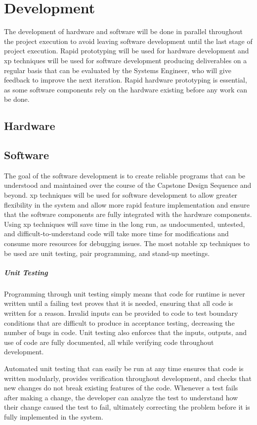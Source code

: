 \chapter{Development}
The development of hardware and software will be done in parallel throughout the project execution to avoid leaving software development until the last stage of project execution. 
Rapid prototyping will be used for hardware development and \gls{xp} techniques will be used for software development producing deliverables on a regular basis that can be evaluated by the Systems Engineer, who will give feedback to improve the next iteration. 
Rapid hardware prototyping is essential, as some software components rely on the hardware existing before any work can be done.
\section{Hardware}
\section{Software}
The goal of the software development is to create reliable programs that can be understood and maintained over the course of the Capstone Design Sequence and beyond.
\gls{xp} techniques will be used for software development to allow greater flexibility in the system and allow more rapid feature implementation and ensure that the software components are fully integrated with the hardware components. 
Using \gls{xp} techniques will save time in the long run, as undocumented, untested, and difficult-to-understand code will take more time for modifications and consume more resources for debugging issues.
The most notable \gls{xp} techniques to be used are unit testing, pair programming, and stand-up meetings.

\paragraph{Unit Testing}
Programming through unit testing simply means that code for runtime is never written until a failing test proves that it is needed, ensuring that all code is written for a reason.
Invalid inputs can be provided to code to test boundary conditions that are difficult to produce in acceptance testing, decreasing the number of bugs in code.
Unit testing also enforces that the inputs, outputs, and use of code are fully documented, all while verifying code throughout development. 

Automated unit testing that can easily be run at any time ensures that code is written modularly, provides verification throughout development, and checks that new changes do not break existing features of the code.
Whenever a test fails after making a change, the developer can analyze the test to understand how their change caused the test to fail, ultimately correcting the problem before it is fully implemented in the system. 
